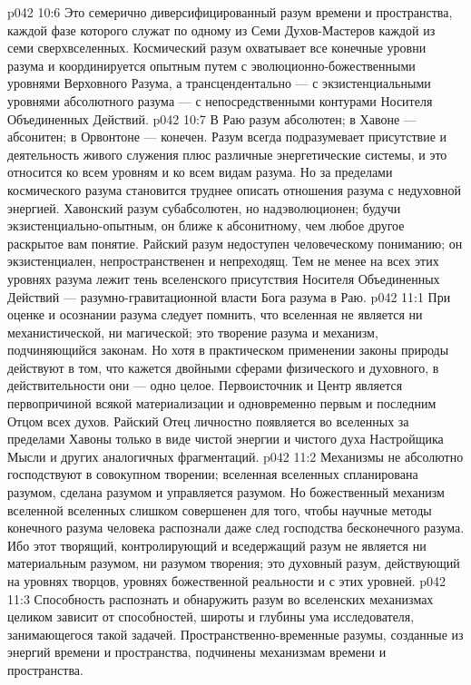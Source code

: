 \vs p042 10:6 \bibnobreakspace {} Это семерично диверсифицированный разум времени и пространства, каждой фазе которого служат по одному из Семи Духов\hyp{}Мастеров каждой из семи сверхвселенных. Космический разум охватывает все конечные уровни разума и координируется опытным путем с эволюционно\hyp{}божественными уровнями Верховного Разума, а трансцендентально --- с экзистенциальными уровнями абсолютного разума --- с непосредственными контурами Носителя Объединенных Действий.
\vs p042 10:7 В Раю разум абсолютен; в Хавоне --- абсонитен; в Орвонтоне --- конечен. Разум всегда подразумевает присутствие и деятельность живого служения плюс различные энергетические системы, и это относится ко всем уровням и ко всем видам разума. Но за пределами космического разума становится труднее описать отношения разума с недуховной энергией. Хавонский разум субабсолютен, но надэволюционен; будучи экзистенциально\hyp{}опытным, он ближе к абсонитному, чем любое другое раскрытое вам понятие. Райский разум недоступен человеческому пониманию; он экзистенциален, непространственен и непреходящ. Тем не менее на всех этих уровнях разума лежит тень вселенского присутствия Носителя Объединенных Действий --- разумно\hyp{}гравитационной власти Бога разума в Раю.
\vs p042 11:1 При оценке и осознании разума следует помнить, что вселенная не является ни механистической, ни магической; это творение разума и механизм, подчиняющийся законам. Но хотя в практическом применении законы природы действуют в том, что кажется двойными сферами физического и духовного, в действительности они --- одно целое. Первоисточник и Центр является первопричиной всякой материализации и одновременно первым и последним Отцом всех духов. Райский Отец личностно появляется во вселенных за пределами Хавоны только в виде чистой энергии и чистого духа Настройщика Мысли и других аналогичных фрагментаций.
\vs p042 11:2 \pc Механизмы не абсолютно господствуют в совокупном творении; вселенная вселенных  спланирована разумом, сделана разумом и управляется разумом. Но божественный механизм вселенной вселенных слишком совершенен для того, чтобы научные методы конечного разума человека распознали даже след господства бесконечного разума. Ибо этот творящий, контролирующий и вседержащий разум не является ни материальным разумом, ни разумом творения; это духовный разум, действующий на уровнях творцов, уровнях божественной реальности и с этих уровней.
\vs p042 11:3 Способность распознать и обнаружить разум во вселенских механизмах целиком зависит от способностей, широты и глубины ума исследователя, занимающегося такой задачей. Пространственно\hyp{}временные разумы, созданные из энергий времени и пространства, подчинены механизмам времени и пространства.
